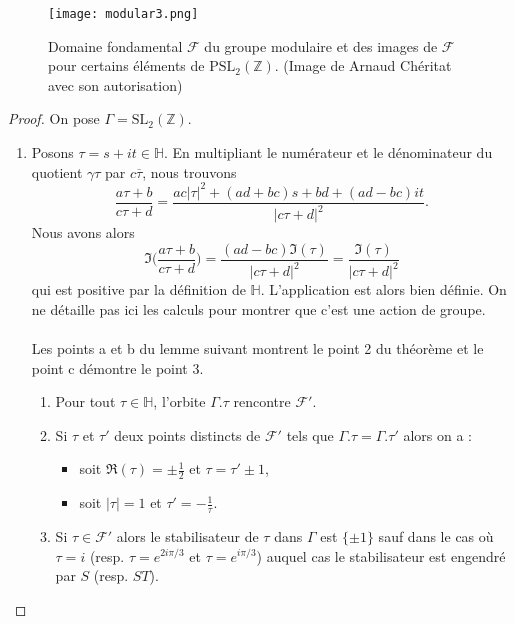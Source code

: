 \documentclass[a4paper]{article}
\begin{document}
\begin{figure}[!h]
\centering
\texttt{[image: modular3.png]}
\caption{Domaine fondamental $\mathcal{F}$ du groupe modulaire et des images de $\mathcal{F}$ pour certains éléments de $\text{PSL}_2(\mathbb{Z})$.
 (Image de Arnaud Chéritat avec son autorisation)}
\label{neutre}
\end{figure}

\begin{proof}
On pose $\Gamma=\text{SL}_2(\mathbb{Z})$.
\begin{enumerate}
\item Posons $\tau=s+it \in \mathbb{H}$. En multipliant le numérateur et le dénominateur du quotient $\gamma\tau$ par $c\overline{\tau}$, nous trouvons
\begin{equation*}
\frac{a\tau+b}{c\tau+d}=\frac{ac|\tau|^2+(ad+bc)s+bd+(ad-bc)it}{|c\tau+d|^2}.
\end{equation*}
Nous avons alors 
\begin{equation} \label{equa2}
\Im\Big(\frac{a\tau+b}{c\tau+d}\Big)=\frac{(ad-bc)\Im(\tau)}{|c\tau+d|^2}=\frac{\Im(\tau)}{|c\tau+d|^2}
\end{equation}
qui est positive par la définition de $\mathbb{H}$. L'application est alors bien définie. On ne détaille pas ici les calculs pour montrer que c'est une action de groupe.
\\ \\
Les points a et b du lemme suivant montrent le point 2  du théorème et le point c démontre le point 3.
\newpage
\begin{lem} \label{leme1}
\begin{enumerate}
\item Pour tout $\tau \in \mathbb{H}$, l'orbite $\Gamma.\tau$ rencontre $\mathcal{F}'$.
\item Si $\tau$ et $\tau'$ deux points distincts de $\mathcal{F}'$ tels que $\Gamma.\tau=\Gamma.\tau'$ alors on a :  \begin{itemize}
\item soit $\Re(\tau)=\pm \frac{1}{2}$ et $\tau=\tau'\pm 1$,
\item soit $|\tau|=1$ et $\tau'=-\frac{1}{\tau}$.
\end{itemize}
 \item Si $\tau \in \mathcal{F}'$ alors le stabilisateur de $\tau$ dans $\Gamma$ est $\{ \pm 1\}$ sauf dans le cas où $\tau=i$ (resp. $\tau=e^{2i\pi/3}$ et $\tau=e^{i\pi/3}$) auquel cas le stabilisateur est engendré par $S$ (resp. $ST$).
\end{enumerate}
\end{lem}



\end{enumerate}
\end{proof}
\end{document}
